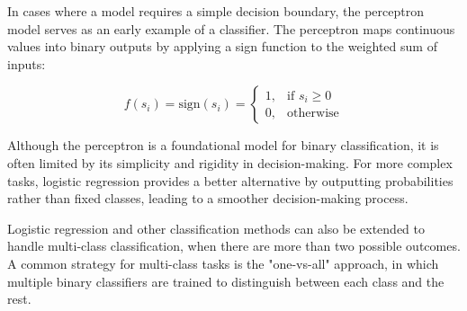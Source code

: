 




In cases where a model requires a simple decision boundary, the perceptron model serves as an early example of a classifier. The perceptron maps continuous values into binary outputs by applying a sign function to the weighted sum of inputs:

\[
f(s_i) = \text{sign}(s_i) = \begin{cases} 
      1, & \text{if } s_i \geq 0 \\ 
      0, & \text{otherwise} 
   \end{cases}
\]

Although the perceptron is a foundational model for binary classification, it is often limited by its simplicity and rigidity in decision-making. For more complex tasks, logistic regression provides a better alternative by outputting probabilities rather than fixed classes, leading to a smoother decision-making process.


Logistic regression and other classification methods can also be extended to handle multi-class classification, when there are more than two possible outcomes. A common strategy for multi-class tasks is the "one-vs-all" approach, in which multiple binary classifiers are trained to distinguish between each class and the rest. %




